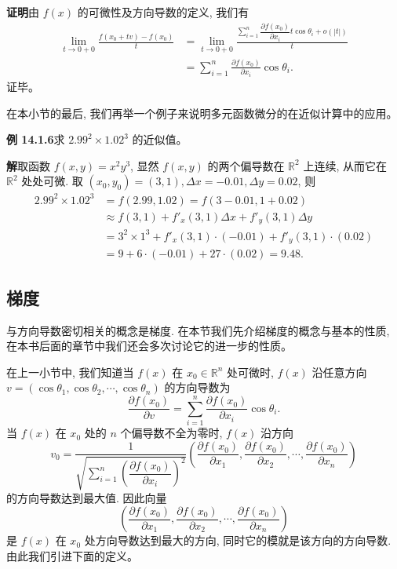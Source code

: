 \documentclass[UTF8, 12pt, fontset=fandol, oneside]{ctexart}
\begin{document}
\noindent\textbf{证明}\quad 由 $f(x)$ 的可微性及方向导数的定义, 我们有
\[
\begin{aligned}
  \lim_{t\to0+0}\frac{f(x_0+tv)-f(x_0)}{t}
  &=\lim_{t\to0+0}
  \frac{\sum\limits_{i=1}^n\dfrac{\partial f(x_0)}{\partial x_i}t\cos\theta_i+o(|t|)}{t}\\
  &=\sum_{i=1}^n\frac{\partial f(x_0)}{\partial x_i}\cos\theta_i.
\end{aligned}
\]
证毕。

在本小节的最后, 我们再举一个例子来说明多元函数微分的在近似计算中的应用。

\noindent\textbf{例 14.1.6}\quad 求 $2.99^2\times1.02^3$ 的近似值。

\noindent\textbf{解}\quad 取函数 $f(x,y)=x^2y^3$, 显然 $f(x,y)$ 的两个偏导数在 $\mathbb R^2$ 上连续, 从而它在 $\mathbb R^2$ 处处可微. 取 $(x_0,y_0)=(3,1), \Delta x=-0.01, \Delta y=0.02$, 则
\[
\begin{aligned}
  2.99^2\times1.02^3
  &=f(2.99,1.02)=f(3-0.01,1+0.02)\\
  &\approx f(3,1)+f'_x(3,1)\Delta x+f'_y(3,1)\Delta y\\
  &=3^2\times1^3+f'_x(3,1)\cdot(-0.01)+f'_y(3,1)\cdot(0.02)\\
  &=9+6\cdot(-0.01)+27\cdot(0.02)=9.48.
\end{aligned}
\]

\subsection{梯度}

与方向导数密切相关的概念是梯度. 在本节我们先介绍梯度的概念与基本的性质, 在本书后面的章节中我们还会多次讨论它的进一步的性质。

在上一小节中, 我们知道当 $f(x)$ 在 $x_0\in\mathbb R^n$ 处可微时, $f(x)$ 沿任意方向 $v=(\cos\theta_1,\cos\theta_2,\cdots,\cos\theta_n)$ 的方向导数为
\[
  \frac{\partial f(x_0)}{\partial v}=
  \sum_{i=1}^n\frac{\partial f(x_0)}{\partial x_i}\cos\theta_i.
\]
当 $f(x)$ 在 $x_0$ 处的 $n$ 个偏导数不全为零时, $f(x)$ 沿方向
\[
  v_0=
  \frac1{\sqrt{\sum\limits_{i=1}^n\left(\dfrac{\partial f(x_0)}{\partial x_i}\right)^2}}
  \left(\frac{\partial f(x_0)}{\partial x_1},\frac{\partial f(x_0)}{\partial x_2},\cdots,\frac{\partial f(x_0)}{\partial x_n}\right)
\]
的方向导数达到最大值. 因此向量
\[
  \left(\frac{\partial f(x_0)}{\partial x_1},\frac{\partial f(x_0)}{\partial x_2},\cdots,\frac{\partial f(x_0)}{\partial x_n}\right)
\]
是 $f(x)$ 在 $x_0$ 处方向导数达到最大的方向, 同时它的模就是该方向的方向导数. 由此我们引进下面的定义。
\end{document}
